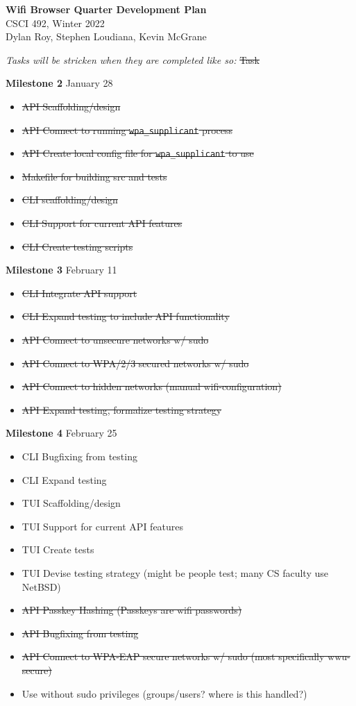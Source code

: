 \documentclass[11pt]{article}
\begin{document}
\begin{center}
  \textbf{\Large Wifi Browser Quarter Development Plan}\\\large CSCI 492, Winter 2022\\
  Dylan Roy, Stephen Loudiana, Kevin McGrane
\end{center}


\textit{Tasks will be stricken when they are completed like so:} \sout{Task}

\textbf{Milestone 2} January 28
\begin{itemize}
  \item\sout{API Scaffolding/design}
  \item\sout{API Connect to running \texttt{wpa\_supplicant} process}
  \item\sout{API Create local config file for \texttt{wpa\_supplicant} to use}
  \item\sout{Makefile for building src and tests}
  \item\sout{CLI scaffolding/design}
  \item\sout{CLI Support for current API features}
  \item\sout{CLI Create testing scripts}
\end{itemize}

\textbf{Milestone 3} February 11
\begin{itemize}
  \item\sout{CLI Integrate API support}
  \item\sout{CLI Expand testing to include API functionality}
  \item\sout{API Connect to unsecure networks w/ sudo}
  \item\sout{API Connect to WPA/2/3 secured networks w/ sudo}
  \item\sout{API Connect to hidden networks (manual wifi-configuration)}
  \item\sout{API Expand testing, formalize testing strategy}
\end{itemize}

\textbf{Milestone 4} February 25
\begin{itemize}
  \item CLI Bugfixing from testing
  \item CLI Expand testing
  \item TUI Scaffolding/design
  \item TUI Support for current API features
  \item TUI Create tests
  \item TUI Devise testing strategy (might be people test; many CS faculty use NetBSD)
  \item\sout{API Passkey Hashing (Passkeys are wifi passwords)}
  \item\sout{API Bugfixing from testing}
  \item\sout{API Connect to WPA-EAP secure networks w/ sudo (most specifically wwu-secure)}
  \item Use without sudo privileges (groups/users? where is this handled?)
\end{itemize}
\end{document}
